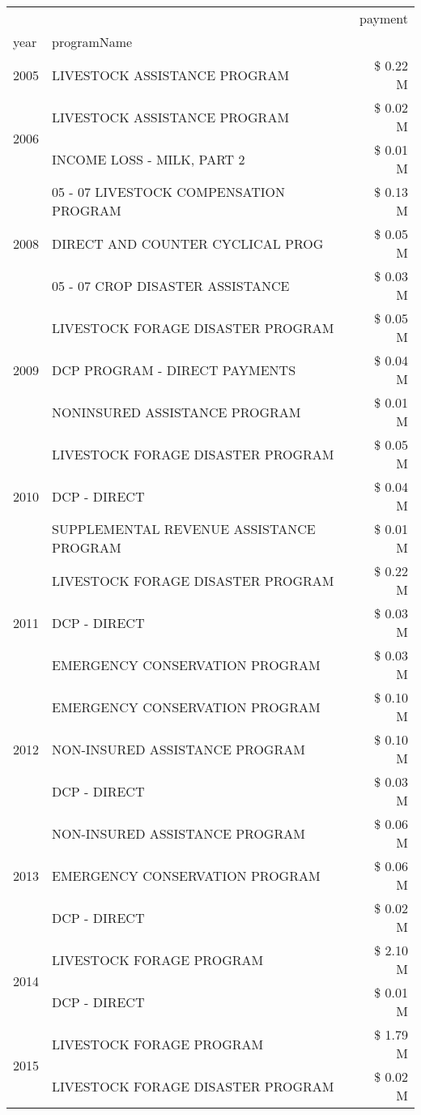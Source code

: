 \begin{tabular}{llr}
\toprule
 &  & payment \\
year & programName &  \\
\midrule
2005 & LIVESTOCK ASSISTANCE PROGRAM & \$ 0.22 M \\
\cline{1-3}
\multirow[t]{2}{*}{2006} & LIVESTOCK ASSISTANCE PROGRAM & \$ 0.02 M \\
 & INCOME LOSS - MILK, PART 2 & \$ 0.01 M \\
\cline{1-3}
\multirow[t]{3}{*}{2008} & 05 - 07 LIVESTOCK COMPENSATION PROGRAM & \$ 0.13 M \\
 & DIRECT AND COUNTER CYCLICAL PROG & \$ 0.05 M \\
 & 05 - 07 CROP DISASTER ASSISTANCE & \$ 0.03 M \\
\cline{1-3}
\multirow[t]{3}{*}{2009} & LIVESTOCK FORAGE DISASTER  PROGRAM & \$ 0.05 M \\
 & DCP PROGRAM - DIRECT PAYMENTS & \$ 0.04 M \\
 & NONINSURED ASSISTANCE PROGRAM & \$ 0.01 M \\
\cline{1-3}
\multirow[t]{3}{*}{2010} & LIVESTOCK FORAGE DISASTER PROGRAM & \$ 0.05 M \\
 & DCP - DIRECT & \$ 0.04 M \\
 & SUPPLEMENTAL REVENUE ASSISTANCE PROGRAM & \$ 0.01 M \\
\cline{1-3}
\multirow[t]{3}{*}{2011} & LIVESTOCK FORAGE DISASTER PROGRAM & \$ 0.22 M \\
 & DCP - DIRECT & \$ 0.03 M \\
 & EMERGENCY CONSERVATION PROGRAM & \$ 0.03 M \\
\cline{1-3}
\multirow[t]{3}{*}{2012} & EMERGENCY CONSERVATION PROGRAM & \$ 0.10 M \\
 & NON-INSURED ASSISTANCE PROGRAM & \$ 0.10 M \\
 & DCP - DIRECT & \$ 0.03 M \\
\cline{1-3}
\multirow[t]{3}{*}{2013} & NON-INSURED ASSISTANCE PROGRAM & \$ 0.06 M \\
 & EMERGENCY CONSERVATION PROGRAM & \$ 0.06 M \\
 & DCP - DIRECT & \$ 0.02 M \\
\cline{1-3}
\multirow[t]{2}{*}{2014} & LIVESTOCK FORAGE PROGRAM & \$ 2.10 M \\
 & DCP - DIRECT & \$ 0.01 M \\
\cline{1-3}
\multirow[t]{3}{*}{2015} & LIVESTOCK FORAGE PROGRAM & \$ 1.79 M \\
 & LIVESTOCK FORAGE DISASTER PROGRAM & \$ 0.02 M \\

\end{tabular}
